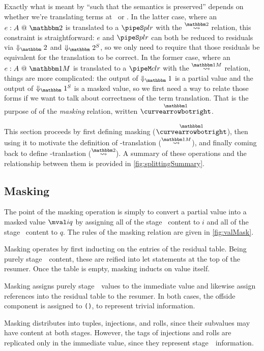 \begin{abstrsyn}
Exactly what is meant by ``such that the semantics is preserved'' depends on whether we're translating
terms at \bbonem\ or \bbtwo.  
In the latter case, where an $\coltwo e A$ is translated to a $\pipeS p l r$ with the $\splittwosym$ relation,
this constraint is straightforward: $e$ and $\pipeS p l r$ can both be reduced to residuals
via $\redtwosym$ and $\sepredtwosym$, so we only need to require that those
residuals be equivalent for the translation to be correct.
In the former case, where an $\colone e A$ is translated to a $\pipeM c l r$ with the $\splitonesym$ relation, 
things are more complicated: 
the output of $\redonesym$ is a partial value and the output of $\sepredonesym$ is a masked value,
so we first need a way to relate those forms if we want to talk about correctness of the term translation.
That is the purpose of of the {\em masking} relation, written $\vsplito$.

This section proceeds by first defining masking ($\vsplito$), 
then using it to motivate the definition of \bbonem-translation ($\splitonesym$),
and finally coming back to define \bbtwo-tranlastion ($\splittwosym$).
A summary of these operations and the relationship between them is provided in \ref{fig:splittingSummary}.

\subsection{Masking}

The point of the masking operation is simply to convert a partial value into a masked value $\mval i q$
by assigning all of the stage \bbone\ content to $i$ and all of the stage \bbtwo\ content to $q$.
The rules of the masking relation are given in \ref{fig:valMask}.

Masking operates by first inducting on the entries of the residual table.  
Being purely stage~\bbtwo\ content, these are reified into let statements at the top of the resumer.
Once the table is empty, masking inducts on value itself.

Masking assigns purely stage~\bbone\ values to the immediate value
and likewise assign references into the residual table to the resumer.
In both cases, the offside component is assigned to \texttt{()}, to represent trivial information.

Masking distributes into tuples, injections, and rolls, since their subvalues may have content at both stages.
However, the tags of injections and rolls are replicated only in the immediate value, 
since they represent stage~\bbone\ information.


\end{abstrsyn}

